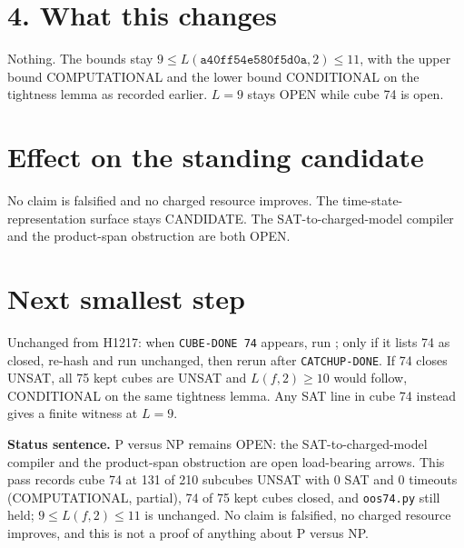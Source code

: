 \documentclass[11pt]{article}
\begin{document}
\section*{4. What this changes}
Nothing. The bounds stay $9\le L(\texttt{a40ff54e580f5d0a},2)\le 11$, with the upper bound COMPUTATIONAL and the lower bound CONDITIONAL on the tightness lemma as recorded earlier. $L=9$ stays OPEN while cube 74 is open.

\section*{Effect on the standing candidate}
No claim is falsified and no charged resource improves. The time-state-representation surface stays CANDIDATE. The SAT-to-charged-model compiler and the product-span obstruction are both OPEN.

\section*{Next smallest step}
Unchanged from H1217: when \texttt{CUBE-DONE 74} appears, run ; only if it lists 74 as closed, re-hash and run  unchanged, then rerun  after \texttt{CATCHUP-DONE}. If 74 closes UNSAT, all 75 kept cubes are UNSAT and $L(f,2)\ge 10$ would follow, CONDITIONAL on the same tightness lemma. Any SAT line in cube 74 instead gives a finite witness at $L=9$.

\bigskip
\noindent\textbf{Status sentence.} P versus NP remains OPEN: the SAT-to-charged-model compiler and the product-span obstruction are open load-bearing arrows. This pass records cube 74 at 131 of 210 subcubes UNSAT with 0 SAT and 0 timeouts (COMPUTATIONAL, partial), 74 of 75 kept cubes closed, and \texttt{oos74.py} still held; $9\le L(f,2)\le 11$ is unchanged. No claim is falsified, no charged resource improves, and this is not a proof of anything about P versus NP.
\end{document}
